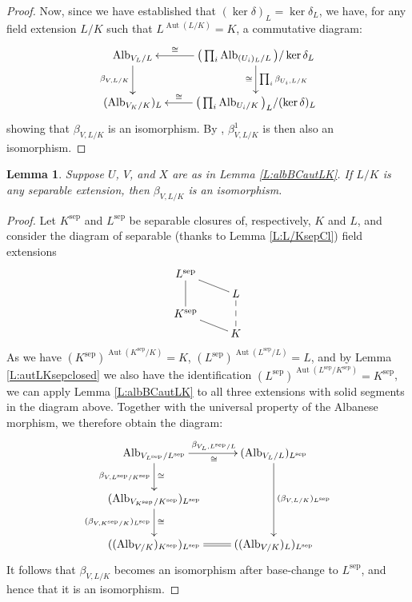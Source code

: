 \documentclass[11pt, reqno]{amsart}
\numberwithin{equation}{section}
\newtheorem{lem}[teo]{Lemma}
\theoremstyle{definition}
\theoremstyle{remark}
\def\sep{{\text{sep}}}
\def\iso{\cong}
\DeclareMathOperator{\aut}{Aut}
\DeclareMathOperator{\alb}{Alb}
\begin{document}
\begin{proof}
  Now, since we have established that $(\ker \delta)_L=\ker \delta_L$, 
   we have, for any field extension $L/K$ such that $L^{\aut(L/K)} = K$, a commutative diagram:
$$
\xymatrix{
\alb_{V_L/L} \ar[d]_{\beta_{V,L/K}}&\big(\prod_i \alb_{(U_i)_L/L}\big) / \ker \delta_L \ar[l]_<>(0.5)\iso  \ar[d]^{\prod_i \beta_{U_i,L/K}}_\iso\\
(\operatorname{Alb}_{V_K/K})_L& \big(\prod_i \alb_{U_i/K}\big)_L / (\ker\delta)_L \ar[l]_<>(0.5)\iso
}
$$  
    showing that    $\beta_{V,L/K}$ is an isomorphism. By , $\beta^1_{V,L/K}$ is then also an
  isomorphism.
                    \end{proof}




 \begin{lem}
  \label{L:albBCsmoothalteration}
  Suppose $U$, $V$, and $X$ are as in Lemma \ref{L:albBCautLK}.  If $L/K$
  is any separable extension, then $\beta_{V,L/K}$ is an isomorphism.
 \end{lem}

 \begin{proof}
  Let $K^{\sep}$ and $L^{\sep}$ be separable closures of, respectively, $K$ and
  $L$, and consider the diagram of separable (thanks to Lemma \ref{L:L/KsepCl})
  field extensions
  \[
  \xymatrix@R=.5em{
   L^{\sep} \ar@{-}[dd] \ar@{-}[dr] \\
   & L \ar@{--}[dd]\\
   K^{\sep}\ar@{-}[dr]&\\
   &K
  }
  \]
  As we have $(K^{\sep})^{\operatorname{Aut}(K^{\sep}/K)} = K$,
  $(L^{\sep})^{\operatorname{Aut}(L^{\sep}/L)} = L$, and by
  Lemma \ref{L:autLKsepclosed} we also have the identification 
  $(L^{\sep})^{\operatorname{Aut}(L^{\sep}/K^{\sep})} = K^{\sep}$, we can
  apply Lemma \ref{L:albBCautLK} to all three extensions with solid segments  in the diagram above.
  Together with  the
  universal property of the Albanese morphism, we therefore obtain the diagram:
  $$
  \xymatrix{\operatorname{Alb}_{V_{L^\sep}/L^{\sep}} \ar[r]_\cong^{\beta_{V_L, L^\sep/L}}\ar[d]^\cong_{\beta_{{V}, L^\sep/K^\sep}} &
   (\operatorname{Alb}_{V_L/L})_{L^{\sep}} \ar[dd]^{(\beta_{V, L/K})_{L^\sep}} \\
   (\operatorname{Alb}_{V_{K^\sep}/K^\sep})_{L^{\sep}} \ar[d]^{\cong}_{(\beta_{V,K^\sep/K})_{L^\sep}}&
   \\
     ((\operatorname{Alb}_{V/K})_{K^{\sep}})_{L^{\sep}} \ar@{=}[r] & ((\operatorname{Alb}_{V/K})_L)_{L^{\sep}}
   }
   $$ 
   It follows that
  $\beta_{V, L/K}$  becomes an isomorphism after base-change to $L^{\sep}$, and
  hence that it
  is an isomorphism.
 \end{proof}
\end{document}
